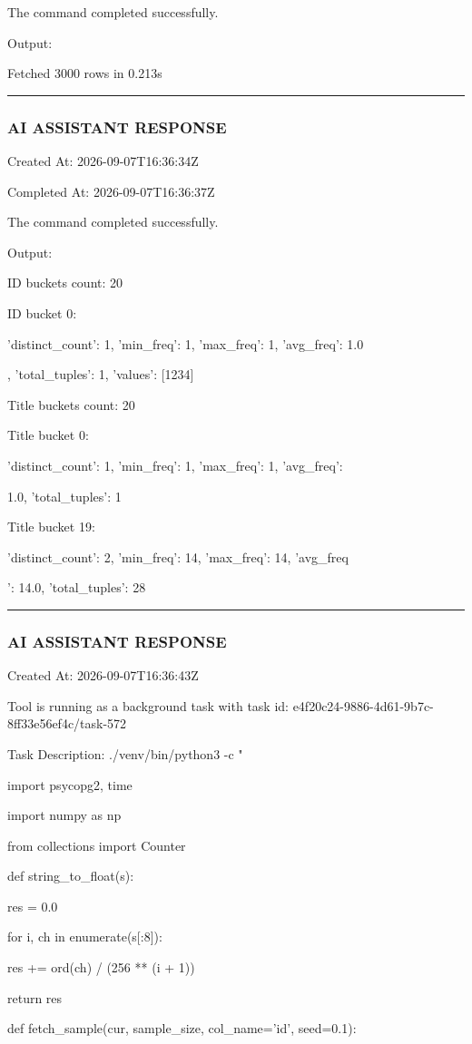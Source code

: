\documentclass[11pt,a4paper]{article}
\begin{document}
The command completed successfully.

Output:

Fetched 3000 rows in 0.213s


\hrule

\subsubsection{AI ASSISTANT RESPONSE}

Created At: 2026-09-07T16:36:34Z

Completed At: 2026-09-07T16:36:37Z


The command completed successfully.

Output:

ID buckets count: 20

ID bucket 0: {'distinct\_count': 1, 'min\_freq': 1, 'max\_freq': 1, 'avg\_freq': 1.0

, 'total\_tuples': 1, 'values': [1234]}

Title buckets count: 20

Title bucket 0: {'distinct\_count': 1, 'min\_freq': 1, 'max\_freq': 1, 'avg\_freq':

1.0, 'total\_tuples': 1}

Title bucket 19: {'distinct\_count': 2, 'min\_freq': 14, 'max\_freq': 14, 'avg\_freq

': 14.0, 'total\_tuples': 28}


\hrule

\subsubsection{AI ASSISTANT RESPONSE}

Created At: 2026-09-07T16:36:43Z

Tool is running as a background task with task id: e4f20c24-9886-4d61-9b7c-8ff33e56ef4c/task-572

Task Description: ./venv/bin/python3 -c "

import psycopg2, time

import numpy as np

from collections import Counter


def string\_to\_float(s):

res = 0.0

for i, ch in enumerate(s[:8]):

res += ord(ch) / (256 ** (i + 1))

return res


def fetch\_sample(cur, sample\_size, col\_name='id', seed=0.1):
\end{document}

